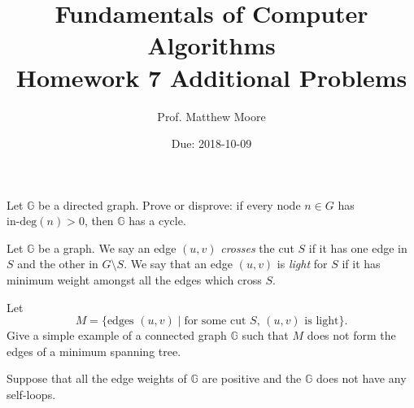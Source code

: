 \documentclass{exam} %
\newcommand{\m}[1]{\mathbb{#1}}    %
\theoremstyle{plain}
\theoremstyle{definition}
\theoremstyle{remark}
\numberwithin{equation}{section}  %
\begin{document}
\title{Fundamentals of Computer Algorithms \\ Homework 7 Additional Problems}
\author{Prof. Matthew Moore}
\date{Due: 2018-10-09}
\maketitle
\begin{questions}
\question Let $\m{G}$ be a directed graph. Prove or disprove: if every node
$n\in G$ has $\text{in-deg}(n) > 0$, then $\m{G}$ has a cycle.

\question Let $\m{G}$ be a graph. We say an edge $(u,v)$ \emph{crosses} the
cut $S$ if it has one edge in $S$ and the other in $G\setminus S$. We say
that an edge $(u,v)$ is \emph{light} for $S$ if it has minimum weight
amongst all the edges which cross $S$.

\medskip

Let
\[
  M
  = \Big\{ \text{edges } (u,v) \mid \text{for some cut $S$, $(u,v)$ is light} \Big\}.
\]
Give a simple example of a connected graph $\m{G}$ such that $M$ does not
form the edges of a minimum spanning tree.

\question Suppose that all the edge weights of $\m{G}$ are positive and the
$\m{G}$ does not have any self-loops.
\end{questions} 
\end{document}
